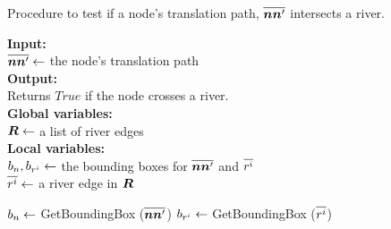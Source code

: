 \begin{algorithm}[tb!]
    \caption{Procedure to test if a node's translation path, $ \protect\overline{\bm{n}\bm{n}'} $ intersects a river.}\label{alg:check river intersection}
    \textbf{Input:} \\
    $ \protect\overline{\bm{n}\bm{n}'} \gets $ the node's translation path \\

    \textbf{Output:} \\
    Returns $ True $ if the node crosses a river. \\

    \textbf{Global variables:} \\
    $ \bm{R} \gets $ a list of river edges \\

    \textbf{Local variables:} \\
    $ b_n, b_{r^i} \gets $ the bounding boxes for $ \protect\overline{\bm{n}\bm{n}'} $ and $ \protect\overline{r^i} $ \\
    $ \protect\overline{r^i} \gets $ a river edge in $ \bm{R} $ \\ 

    \begin{algorithmic}[1]
        
        \ForEach{$ \riverEdgeListEachLine \in \riverEdgeList $}
            \State $ b_n \gets $ GetBoundingBox ($ \protect\overline{\bm{n}\bm{n}'} $)
            \State $ b_{r^i} \gets $ GetBoundingBox ($ \protect\overline{r^i} $)

                \State {}
                \EndIf
        \EndFor
        
        \State {}
        \EndProcedure
    \end{algorithmic}
\end{algorithm}


